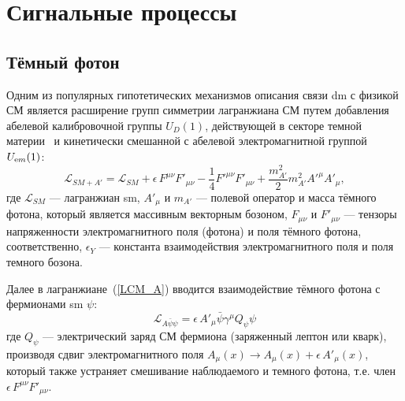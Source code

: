 \section{Сигнальные процессы}

\subsection{Тёмный фотон}

Одним из популярных гипотетических механизмов описания связи \acrshort{dm}
с физикой СМ является расширение групп симметрии 
лагранжиана СМ путем добавления абелевой калибровочной группы $U_D(1)$, 
действующей в секторе темной материи~\cite{holdom} и кинетически смешанной 
с абелевой электромагнитной группой $U_{\textrm em}(1)$:
\begin{equation}
\label{LCM_A}
    \mathcal{L}_{SM+A'} = \mathcal{L}_{SM} + \epsilon \, F^{\mu\nu} F'_{\mu \nu}
        - \frac{1}{4} F'^{\mu\nu} F'_{\mu\nu} + \frac{m_{A'}^2}{2} m_{A'}^2 A'^{\mu}A'_{\mu},
\end{equation}
где
$\mathcal{L}_{SM}$ --- лагранжиан \acrshort{sm}, 
$A'_{\mu}$ и $m_{A'}$ --- полевой оператор и масса тёмного фотона, 
который является массивным векторным бозоном, 
$F_{\mu \nu}$ и $F'_{\mu \nu}$ --- тензоры напряженности 
электромагнитного поля (фотона) и поля тёмного фотона, соответственно,
$\epsilon_Y$ --- константа взаимодействия  
электромагнитного поля и поля темного бозона. 


Далее в лагранжиане~(\ref{LCM_A}) вводится взаимодействие тёмного 
фотона с фермионами \acrshort{sm} $\psi$:
\begin{equation}
\label{L_Apsi}
    \mathcal{L}_{A\bar\psi\psi} = \epsilon \, A'_\mu  
    \bar\psi \gamma^\mu Q_\psi \psi 
\end{equation}
где $Q_\psi$ --- электрический заряд СМ фермиона (заряженный лептон или кварк), 
производя сдвиг электромагнитного поля 
$A_\mu(x) \to A_\mu(x) + \epsilon \, A'_\mu(x)$, который также устраняет 
смешивание наблюдаемого и темного фотона, т.е. член 
$\epsilon \, F^{\mu\nu} F'_{\mu \nu}$.

